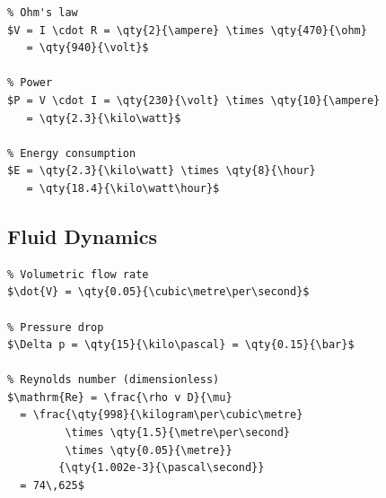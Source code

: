 \begin{verbatim}
% Ohm's law
$V = I \cdot R = \qty{2}{\ampere} \times \qty{470}{\ohm}
   = \qty{940}{\volt}$

% Power
$P = V \cdot I = \qty{230}{\volt} \times \qty{10}{\ampere}
   = \qty{2.3}{\kilo\watt}$

% Energy consumption
$E = \qty{2.3}{\kilo\watt} \times \qty{8}{\hour}
   = \qty{18.4}{\kilo\watt\hour}$
\end{verbatim}

\subsection{Fluid Dynamics}

\begin{verbatim}
% Volumetric flow rate
$\dot{V} = \qty{0.05}{\cubic\metre\per\second}$

% Pressure drop
$\Delta p = \qty{15}{\kilo\pascal} = \qty{0.15}{\bar}$

% Reynolds number (dimensionless)
$\mathrm{Re} = \frac{\rho v D}{\mu}
  = \frac{\qty{998}{\kilogram\per\cubic\metre}
         \times \qty{1.5}{\metre\per\second}
         \times \qty{0.05}{\metre}}
        {\qty{1.002e-3}{\pascal\second}}
  = 74\,625$
\end{verbatim}

